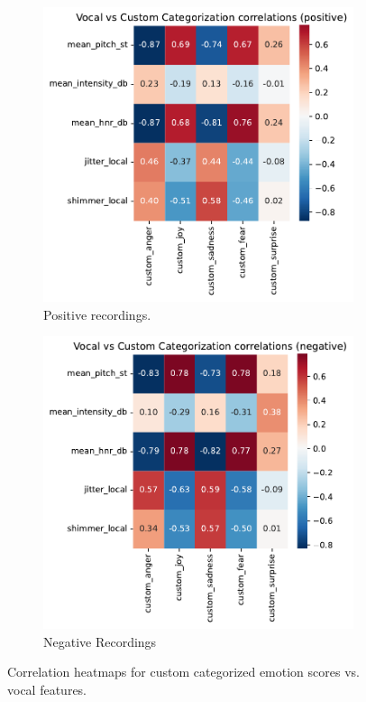 \begin{figure}[H]
    \centering 
    \begin{subfigure}[b]{0.45\textwidth}
        \includegraphics[width=\textwidth]{png/results/rq1_nr3/vocal_vs_custom_categorization_correlations_positive.png.pdf}
        \caption{Positive recordings.}
        \label{fig:custom_vocal_positive}
    \end{subfigure}
    \begin{subfigure}[b]{0.45\textwidth}
        \includegraphics[width=\textwidth]{png/results/rq1_nr3/vocal_vs_custom_categorization_correlations_negative.png.pdf}
        \caption{Negative Recordings}        
        \label{fig:custom_vocal_negative}
    \end{subfigure} 
    \caption{Correlation heatmaps for custom categorized emotion scores vs. vocal features.}
    \label{fig:rq1_heatmaps_custom}       
\end{figure}
